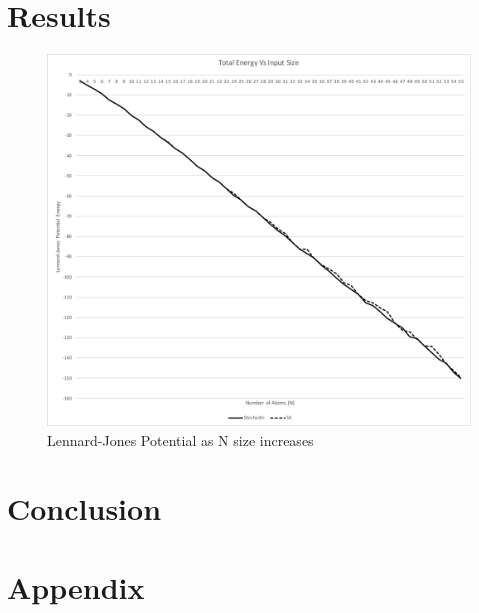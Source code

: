 \documentclass{article}
\begin{document}
\section{Results}

\begin{figure}
	\includegraphics[width=\textwidth]{nvse.pdf}
	\caption{Lennard-Jones Potential as N size increases}
	\label{fig:nvse}
\end{figure}

\section{Conclusion}



\section{Appendix}
\end{document}
